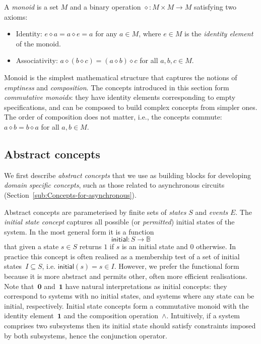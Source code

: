 \documentclass[british, journal]{IEEEtran}
\begin{document}
A \emph{monoid} is a set $M$ and a binary operation $\diamond : M\times M\rightarrow M$
satisfying two axioms:
\begin{itemize}
\item Identity: $e\diamond a=a\diamond e=a$ for any $a\in M$, where $e\in M$
is the \emph{identity element} of the monoid.
\item Associativity: $a\diamond(b\diamond c)=(a\diamond b)\diamond c$ for
all $a,b,c\in M$.
\end{itemize}
Monoid is the simplest mathematical structure that captures the notions
of \emph{emptiness} and \emph{composition}. The concepts introduced
in this section form \emph{commutative monoids}: they have identity
elements corresponding to empty specifications, and can be composed
to build complex concepts from simpler ones. The order of composition
does not matter, i.e., the concepts commute: $a\diamond b=b\diamond a$
for all $a,b\in M$.

\vspace{-1mm}
\subsection{Abstract concepts}

We first describe \emph{abstract concepts} that we use as building
blocks for developing \emph{domain specific concepts}, such as those
related to asynchronous circuits (Section~\ref{sub:Concepts-for-asynchronous}).

Abstract concepts are parameterised by finite sets of \emph{states}
$S$ and \emph{events} $E$. The \emph{initial state concept} captures
all possible (or \emph{permitted}) initial states of the system. In
the most general form it is a function
\[
\mathsf{initial}:S\rightarrow\mathbb{B}
\]
that given a state $s\in S$ returns $1$ if $s$ is an initial state
and $0$ otherwise. In practice this concept is often realised as
a membership test of a set of initial states~$I\subseteq S$, i.e.
$\mathsf{initial}(s)=s\in I$. However, we prefer the functional form
because it is more abstract and permits other, often more efficient
realisations. Note that~$\mathbf{0}$ and~$\mathbf{1}$ have natural
interpretations as initial concepts: they correspond to systems with
no initial states, and systems where any state can be initial, respectively.
Initial state concepts form a commutative monoid with the identity
element~$\mathbf{1}$ and the composition operation~$\wedge$. Intuitively,
if a system comprises two subsystems then its initial state should
satisfy constraints imposed by both subsystems, hence the conjunction
operator.
\end{document}
